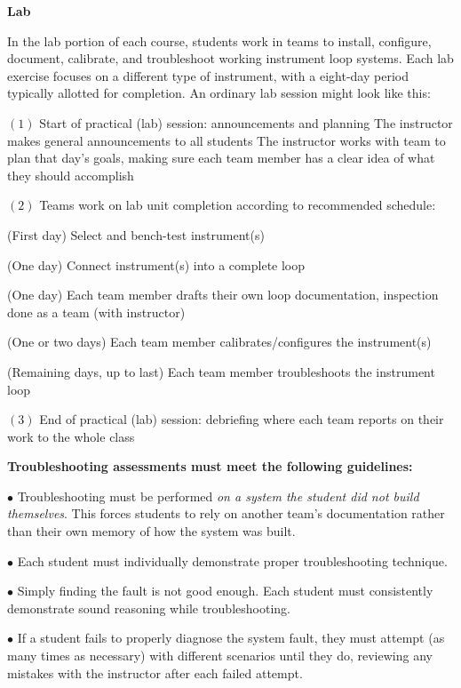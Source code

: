 \noindent
{\bf Lab}

In the lab portion of each course, students work in teams to install, configure, document, calibrate, and troubleshoot working instrument loop systems.  Each lab exercise focuses on a different type of instrument, with a eight-day period typically allotted for completion.  An ordinary lab session might look like this:

\medskip
\item{$(1)$} Start of practical (lab) session: announcements and planning
 The instructor makes general announcements to all students
 The instructor works with team to plan that day's goals, making sure each team member has a clear idea of what they should accomplish
\item{$(2)$} Teams work on lab unit completion according to recommended schedule:
\item\item{(First day)} Select and bench-test instrument(s)
\item\item{(One day)} Connect instrument(s) into a complete loop
\item\item{(One day)} Each team member drafts their own loop documentation, inspection done as a team (with instructor)
\item\item{(One or two days)} Each team member calibrates/configures the instrument(s)
\item\item{(Remaining days, up to last)} Each team member troubleshoots the instrument loop
\item{$(3)$} End of practical (lab) session: debriefing where each team reports on their work to the whole class
\medskip

\vskip 10pt

\noindent
{\bf Troubleshooting assessments must meet the following guidelines:}

\medskip
\item{$\bullet$} Troubleshooting must be performed {\it on a system the student did not build themselves}.  This forces students to rely on another team's documentation rather than their own memory of how the system was built.
\item{$\bullet$} Each student must individually demonstrate proper troubleshooting technique.
\item{$\bullet$} Simply finding the fault is not good enough.  Each student must consistently demonstrate sound reasoning while troubleshooting.
\item{$\bullet$} If a student fails to properly diagnose the system fault, they must attempt (as many times as necessary) with different scenarios until they do, reviewing any mistakes with the instructor after each failed attempt.
\medskip

